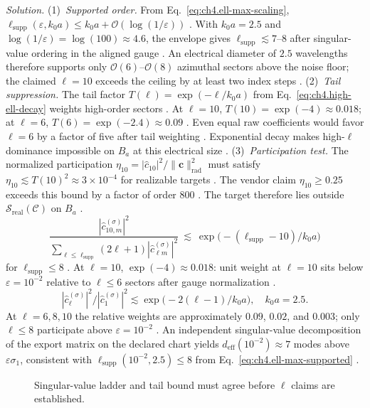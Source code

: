 \emph{Solution.} (1)~\emph{Supported order.} From Eq.~\eqref{eq:ch4.ell-max-scaling}, $\ell_{\mathrm{supp}}(\varepsilon,k_{0}a)\le k_{0}a+\mathcal{O}(\log(1/\varepsilon))$ . With $k_{0}a=2.5$ and $\log(1/\varepsilon)=\log(100)\approx4.6$, the envelope gives $\ell_{\mathrm{supp}}\lesssim7$--$8$ after singular-value ordering in the aligned gauge . An electrical diameter of $2.5$ wavelengths therefore supports only $\mathcal{O}(6)$--$\mathcal{O}(8)$ azimuthal sectors above the noise floor; the claimed $\ell=10$ exceeds the ceiling by at least two index steps .
(2)~\emph{Tail suppression.} The tail factor $T(\ell)=\exp(-\ell/k_{0}a)$ from Eq.~\eqref{eq:ch4.high-ell-decay} weights high-order sectors . At $\ell=10$, $T(10)=\exp(-4)\approx0.018$; at $\ell=6$, $T(6)=\exp(-2.4)\approx0.09$ . Even equal raw coefficients would favor $\ell=6$ by a factor of five after tail weighting . Exponential decay makes high-$\ell$ dominance impossible on $B_{a}$ at this electrical size .
(3)~\emph{Participation test.} The normalized participation $\eta_{10}=|\widehat{c}_{10}|^{2}/\|\mathbf{c}\|_{\mathrm{rad}}^{2}$ must satisfy $\eta_{10}\lesssim T(10)^{2}\approx3\times10^{-4}$ for realizable targets . The vendor claim $\eta_{10}\ge0.25$ exceeds this bound by a factor of order $800$ . The target therefore lies outside $\mathcal{S}_{\mathrm{real}}(\mathcal{C})$ on $B_{a}$ .
\begin{equation}
\label{eq:ch4.ex-ell-tail-ratio}
\frac{|\widehat{c}_{10,m}^{(\sigma)}|^{2}}{\sum_{\ell\le\ell_{\mathrm{supp}}}(2\ell+1)|\widehat{c}_{\ell m}^{(\sigma)}|^{2}}
\ \lesssim\
\exp\!\bigl(-(\ell_{\mathrm{supp}}-10)/k_{0}a\bigr)
\end{equation}
for $\ell_{\mathrm{supp}}\le8$ . At $\ell=10$, $\exp(-4)\approx0.018$: unit weight at $\ell=10$ sits below $\varepsilon=10^{-2}$ relative to $\ell\le6$ sectors after gauge normalization .
\begin{equation}
\label{eq:ch4.ex-ell-sweep}
|\widehat{c}_{\ell}^{(\sigma)}|^{2}/|\widehat{c}_{1}^{(\sigma)}|^{2}\lesssim\exp\!\bigl(-2(\ell-1)/k_{0}a\bigr),\quad k_{0}a=2.5.
\end{equation}
At $\ell=6,8,10$ the relative weights are approximately $0.09$, $0.02$, and $0.003$; only $\ell\le8$ participate above $\varepsilon=10^{-2}$ .
An independent singular-value decomposition of the export matrix on the declared chart yields $d_{\mathrm{eff}}(10^{-2})\approx7$ modes above $\varepsilon\sigma_{1}$, consistent with $\ell_{\mathrm{supp}}(10^{-2},2.5)\le8$ from Eq.~\eqref{eq:ch4.ell-max-supported} .
\begin{figure}[t]
\centering
{}
\caption{Singular-value ladder and tail bound must agree before $\ell$ claims are established.}
\label{fig:ch4.ex-ell-svd-crosscheck}
\end{figure}
